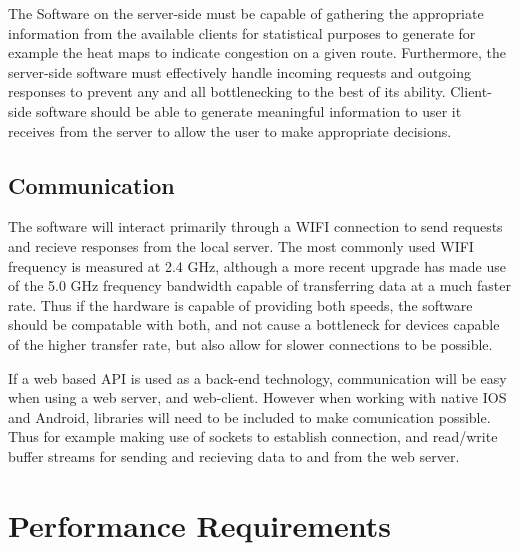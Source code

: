 \documentclass[11pt]{article}
\begin{document}
	The Software on the server-side must be capable of gathering the appropriate information from the available clients for statistical purposes to generate for example the heat maps to indicate congestion on a given route.  Furthermore, the server-side software must effectively handle incoming requests and outgoing responses to prevent any and all bottlenecking to the best of its ability.  Client-side software should be able to generate meaningful information to user it receives from the server to allow the user to make appropriate decisions.  
	\subsection{Communication}
	The software will interact primarily through a WIFI connection to send requests and recieve responses from the local server.  The most commonly used WIFI frequency is measured at 2.4 GHz, although a more recent upgrade has made use of the 5.0 GHz frequency bandwidth capable of transferring data at a much faster rate.  Thus if the hardware is capable of providing both speeds, the software should be compatable with both, and not cause a bottleneck for devices capable of the higher transfer rate, but also allow for slower connections to be possible.  
	
	If a web based API is used as a back-end technology, communication will be easy when using a web server, and web-client.  However when working with native IOS and Android, libraries will need to be included to make comunication possible.  Thus for example making use of sockets to establish connection, and read/write buffer streams for sending and recieving data to and from the web server.  
	
	\section{Performance Requirements}
\end{document}
